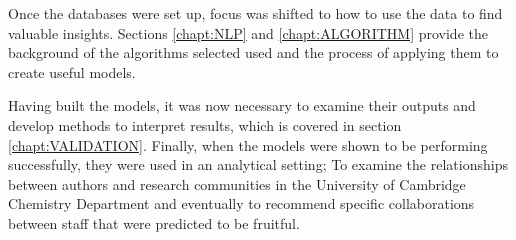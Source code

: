 Once the databases were set up, focus was shifted to how to use the data to find valuable insights. Sections \ref{chapt:NLP} and \ref{chapt:ALGORITHM} provide the background of the algorithms selected used and the process of applying them to create useful models. 

Having built the models, it was now necessary to examine their outputs and develop methods to interpret results, which is covered in section \ref{chapt:VALIDATION}. Finally, when the models were shown to be performing successfully, they were used in an analytical setting; To examine the relationships between authors and research communities in the University of Cambridge Chemistry Department and eventually to recommend specific collaborations between staff that were predicted to be fruitful.
 
